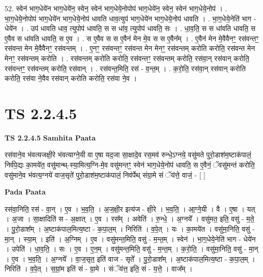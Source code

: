 \documentclass[17pt]{extarticle}
\begin{document}
52. स्वेन॑ भाग॒धेये॑न भाग॒धेये॑न॒ स्वेन॒ स्वेन॑ भाग॒धेये॒नोपोप॑ भाग॒धेये॑न॒ स्वेन॒ स्वेन॑ भाग॒धेये॒नोप॑ । . भा॒ग॒धेये॒नोपोप॑ भाग॒धेये॑न भाग॒धेये॒नोप॑ धावति धाव॒त्युप॑ भाग॒धेये॑न भाग॒धेये॒नोप॑ धावति । . भा॒ग॒धेये॒नेति॑ भाग - धेये॑न । . उप॑ धावति धाव॒ त्युपोप॑ धावति॒ स स धा॑व॒ त्युपोप॑ धावति॒ सः । . धा॒व॒ति॒ स स धा॑वति धावति॒ स ए॒वैव स धा॑वति धावति॒ स ए॒व । . स ए॒वैव स स ए॒वैन॑ मेन मे॒व स स ए॒वैन᳚म् । . ए॒वैन॑ मेन मे॒वैवैनꣳ॒॒ रस॑वन्तꣳ॒॒ रस॑वन्त मेन मे॒वैवैनꣳ॒॒ रस॑वन्तम् । . ए॒नꣳ॒॒ रस॑वन्तꣳ॒॒ रस॑वन्त मेन मेनꣳ॒॒ रस॑वन्तम् करोति करोति॒ रस॑वन्त मेन मेनꣳ॒॒ रस॑वन्तम् करोति । . रस॑वन्तम् करोति करोति॒ रस॑वन्तꣳ॒॒ रस॑वन्तम् करोति॒ रस॑वा॒न् रस॑वान् करोति॒ रस॑वन्तꣳ॒॒ रस॑वन्तम् करोति॒ रस॑वान् । . रस॑वन्त॒मिति॒ रस॑ - व॒न्त॒म् । . क॒रो॒ति॒ रस॑वा॒न् रस॑वान् करोति करोति॒ रस॑वा ने॒वैव रस॑वान् करोति करोति॒ रस॑वा ने॒व । \newline
\pagebreak
{}
\section*{ TS 2.2.4.5 }

\textbf{TS 2.2.4.5 } \newline
\textbf{Samhita Paata} \newline

रस॑वाने॒व भ॑वत्यजक्षी॒रे भ॑वत्याग्ने॒यी वा ए॒षा यद॒जा सा॒क्षादे॒व रस॒मव॑ रुन्धे॒ऽग्नये॒ वसु॑मते पुरो॒डाश॑म॒ष्टाक॑पालं॒ निर्व॑पे॒द्यः का॒मये॑त॒ वसु॑मान्थ्-स्या॒मित्य॒ग्नि-मे॒व वसु॑मन्तꣳ॒॒ स्वेन॑ भाग॒धेये॒नोप॑ धावति॒ स ए॒वैनं॒ ॅवसु॑मन्तं करोति॒ वसु॑माने॒व भ॑वत्य॒ग्नये॑ वाज॒सृते॑ पुरो॒डाश॑म॒ष्टाक॑पालं॒ निव॑र्पेथ् संग्रा॒मे सं ॅय॑त्ते॒ वाजं॒ - [  ] \newline

\textbf{Pada Paata} \newline

रस॑वा॒निति॒ रस॑ - वा॒न् । ए॒व । भ॒व॒ति॒ । अ॒ज॒क्षी॒र इत्य॑ज - क्षी॒रे । भ॒व॒ति॒ । आ॒ग्ने॒यी । वै । ए॒षा । यत् । अ॒जा । सा॒क्षादिति॑ स - अ॒क्षात् । ए॒व । रस᳚म् । अवेति॑ । रु॒न्धे॒ । अ॒ग्नये᳚ । वसु॑मत॒ इति॒ वसु॑ - म॒ते॒ । पु॒रो॒डाश᳚म् । अ॒ष्टाक॑पाल॒मित्य॒ष्टा - क॒पा॒ल॒म् । निरिति॑ । व॒पे॒त् । यः । का॒मये॑त । वसु॑मा॒निति॒ वसु॑ - मा॒न् । स्या॒म् । इति॑ । अ॒ग्निम् । ए॒व । वसु॑मन्त॒मिति॒ वसु॑ - म॒न्त॒म् । स्वेन॑ । भा॒ग॒धेये॒नेति॑ भाग - धेये॑न । उपेति॑ । धा॒व॒ति॒ । सः । ए॒व । ए॒न॒म् । वसु॑मन्त॒मिति॒ वसु॑ - म॒न्त॒म् । क॒रो॒ति॒ । वसु॑मा॒निति॒॒ वसु॑ - मा॒न् । ए॒व । भ॒व॒ति॒ । अ॒ग्नये᳚ । वा॒ज॒सृत॒ इति॑ वाज - सृते᳚ । पु॒रो॒डाश᳚म् । अ॒ष्टाक॑पाल॒मित्य॒ष्टा - क॒पा॒ल॒म् । निरिति॑ । व॒पे॒त् । स॒ग्रां॒म इति॑ सं - ग्रा॒मे । संॅय॑त्त॒ इति॒ सं - य॒त्ते॒ । वाज᳚म् ।  \newline
\end{document}
